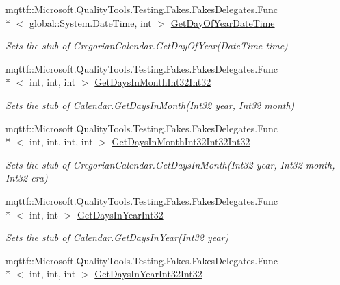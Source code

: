 \begin{DoxyCompactItemize}
mqttf\-::\-Microsoft.\-Quality\-Tools.\-Testing.\-Fakes.\-Fakes\-Delegates.\-Func\\*
$<$ global\-::\-System.\-Date\-Time, int $>$ \hyperlink{class_system_1_1_globalization_1_1_fakes_1_1_stub_gregorian_calendar_a9cbc4a73991afeb4a8a2c8084d06d5f9}{Get\-Day\-Of\-Year\-Date\-Time}
\begin{DoxyCompactList}\small\item\em Sets the stub of Gregorian\-Calendar.\-Get\-Day\-Of\-Year(\-Date\-Time time)\end{DoxyCompactList}\item 
mqttf\-::\-Microsoft.\-Quality\-Tools.\-Testing.\-Fakes.\-Fakes\-Delegates.\-Func\\*
$<$ int, int, int $>$ \hyperlink{class_system_1_1_globalization_1_1_fakes_1_1_stub_gregorian_calendar_a306767364eafecc5eb1287eb58aace07}{Get\-Days\-In\-Month\-Int32\-Int32}
\begin{DoxyCompactList}\small\item\em Sets the stub of Calendar.\-Get\-Days\-In\-Month(\-Int32 year, Int32 month)\end{DoxyCompactList}\item 
mqttf\-::\-Microsoft.\-Quality\-Tools.\-Testing.\-Fakes.\-Fakes\-Delegates.\-Func\\*
$<$ int, int, int, int $>$ \hyperlink{class_system_1_1_globalization_1_1_fakes_1_1_stub_gregorian_calendar_a970efcc1ed7aea103c4cc8fd1636b0a9}{Get\-Days\-In\-Month\-Int32\-Int32\-Int32}
\begin{DoxyCompactList}\small\item\em Sets the stub of Gregorian\-Calendar.\-Get\-Days\-In\-Month(\-Int32 year, Int32 month, Int32 era)\end{DoxyCompactList}\item 
mqttf\-::\-Microsoft.\-Quality\-Tools.\-Testing.\-Fakes.\-Fakes\-Delegates.\-Func\\*
$<$ int, int $>$ \hyperlink{class_system_1_1_globalization_1_1_fakes_1_1_stub_gregorian_calendar_a13e0a6c756144daecad794eef48fa86d}{Get\-Days\-In\-Year\-Int32}
\begin{DoxyCompactList}\small\item\em Sets the stub of Calendar.\-Get\-Days\-In\-Year(\-Int32 year)\end{DoxyCompactList}\item 
mqttf\-::\-Microsoft.\-Quality\-Tools.\-Testing.\-Fakes.\-Fakes\-Delegates.\-Func\\*
$<$ int, int, int $>$ \hyperlink{class_system_1_1_globalization_1_1_fakes_1_1_stub_gregorian_calendar_abaa8ddd3de98eb1b7d3e8502b096a0bd}{Get\-Days\-In\-Year\-Int32\-Int32}

\end{DoxyCompactItemize}

